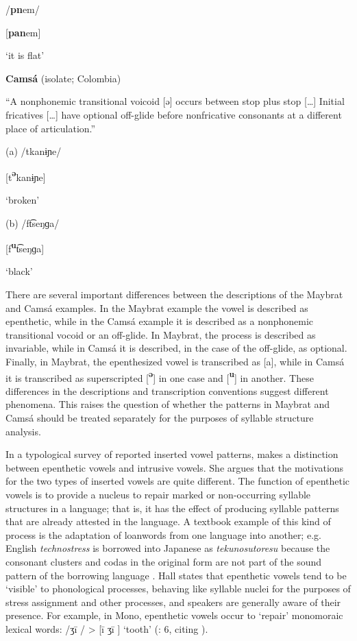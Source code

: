 /\textbf{pn}em/

[\textbf{pan}em]

‘it is flat’

\citep[35-6]{Dol2007}
\z

\ea\label{ex:(3.9)}
  \textbf{Camsá} (isolate; Colombia)

“A nonphonemic transitional voicoid [ə] occurs between stop plus stop […] Initial fricatives […] have optional off-glide before nonfricative consonants at a different place of articulation.” 

(a)   /tkanɨɲe/

  [t\textbf{\textsuperscript{ə}}kanɨɲe]

  ‘broken’

(b)   /ft͡seŋɡa/

  [f\textbf{\textsuperscript{u}}t͡seŋɡa]

  ‘black’

\citep[81]{Howard1967}

\z

  There are several important differences between the descriptions of the Maybrat and Camsá examples. In the Maybrat example the vowel is described as epenthetic, while in the Camsá example it is described as a nonphonemic transitional vocoid or an off-glide. In Maybrat, the process is described as invariable, while in Camsá it is described, in the case of the off-glide, as optional. Finally, in Maybrat, the epenthesized vowel is transcribed as [a], while in Camsá it is transcribed as superscripted [\textbf{\textsuperscript{ə}}] in one case and [\textbf{\textsuperscript{u}}] in another. These differences in the descriptions and transcription conventions suggest different phenomena. This raises the question of whether the patterns in Maybrat and Camsá should be treated separately for the purposes of syllable structure analysis.

  In a typological survey of reported inserted vowel patterns, \citet{Hall2006} makes a distinction between epenthetic vowels and intrusive vowels. She argues that the motivations for the two types of inserted vowels are quite different. The function of epenthetic vowels is to provide a nucleus to repair marked or non-occurring syllable structures in a language; that is, it has the effect of producing syllable patterns that are already attested in the language. A textbook example of this kind of process is the adaptation of loanwords from one language into another; e.g. English \textit{technostress} is borrowed into Japanese as \textit{tekunosutoresu} because the consonant clusters and codas in the original form are not part of the sound pattern of the borrowing language \citep[69]{Kay1995}. Hall states that epenthetic vowels tend to be ‘visible’ to phonological processes, behaving like syllable nuclei for the purposes of stress assignment and other processes, and speakers are generally aware of their presence. For example, in Mono, epenthetic vowels occur to ‘repair’ monomoraic lexical words: /ʒi\={} / > [i\={} ʒi\={} ] ‘tooth’ (\citealt{Hall2006}: 6, citing \citealt{Olson2003}).

